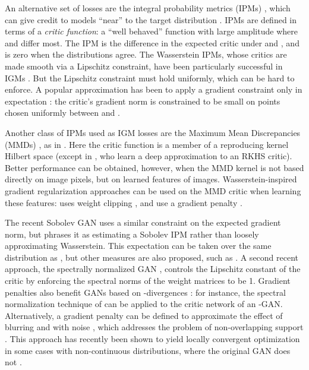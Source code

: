 \documentclass{article}
\let\citep\parencite
\begin{document}
An alternative set of losses are the integral probability metrics (IPMs) \citep{Mueller97},
which can give credit to models   ``near'' to the target
distribution  \parencites{wgan}{Bottou:2017}[Section 4 of][]{GneRaf07}.
IPMs are defined in terms of a {\em critic function}: a
``well behaved'' function with  large amplitude
where  and  differ most.
The IPM is  the difference in the expected critic under  and ,
and is zero when the distributions agree.
The Wasserstein IPMs, whose critics are made smooth via a Lipschitz constraint,
have been particularly successful in IGMs \citep{wgan,wgan-gp,sinkhorn-igm}.
But the Lipschitz constraint must hold uniformly, which can be hard
to enforce. A popular approximation has been to apply a gradient constraint
only in expectation \citep{wgan-gp}:
the critic's gradient norm is constrained to be small
on points chosen uniformly between  and .

Another class of IPMs used as IGM losses
are the Maximum Mean Discrepancies (MMDs) \citep{mmd-jmlr}, as in \citep{gmmn,gen-mmd}. Here the critic
function is a member of a reproducing kernel Hilbert space
(except in \cite{coulomb-gan}, who learn a deep approximation to an RKHS critic).
Better performance can be obtained, however, when the MMD kernel is not based
directly on image pixels, but on learned features
of images. Wasserstein-inspired gradient regularization
approaches can be used on the MMD critic when learning these features:
\citep{mmd-gan} uses weight clipping \citep{wgan}, and \citep{Binkowski:2018,cramer-gan}
use a gradient penalty \citep{wgan-gp}.

The recent Sobolev GAN \citep{sobolev-gan}
uses a similar constraint on the expected gradient norm,
but phrases it as estimating a Sobolev IPM rather than loosely approximating Wasserstein.
This expectation can be taken over the same distribution as \citep{wgan-gp},
but other measures are also proposed,
such as .
A second recent approach, the spectrally normalized GAN \citep{Miyato:2018},
controls the Lipschitz constant of the critic by enforcing the spectral norms of the weight matrices to be 1.
Gradient penalties also benefit GANs based on -divergences \citep{NowBotRyo16}:
for instance, the spectral normalization technique of \citep{Miyato:2018} can be applied to the critic network of an -GAN.
Alternatively, a gradient penalty can be defined to approximate the
effect of blurring  and  with noise \citep{roth:regularization}, which
addresses the problem of non-overlapping support \parencite{towards-principled-gans}.
This approach has recently been shown to yield locally convergent optimization
in some cases with non-continuous distributions,
where the original GAN does not \parencite{Mescheder:2018}.
\end{document}
